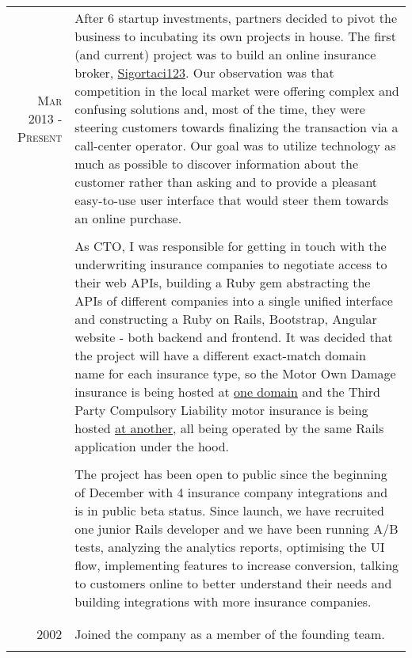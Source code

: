 \documentclass[a4paper,10pt]{article}
\newcommand{\exptitle}[2]{
  \multicolumn{2}{l}{\textsc{#1} \footnotesize{#2}} \\
  \specialrule{.01em}{0.5em}{1em}
}
\begin{document}
\begin{longtable}{r|p{11cm}}
  \textsc{Mar 2013 - Present}   & After 6 startup investments, partners decided to pivot the business to incubating its own projects in house. The first (and current) project was to build an online insurance broker, \href{https://sigortaci123.com}{Sigortaci123}. Our observation was that competition in the local market were offering complex and confusing solutions and, most of the time, they were steering customers towards finalizing the transaction via a call-center operator. Our goal was to utilize technology as much as possible to discover information about the customer rather than asking and to provide a pleasant easy-to-use user interface that would steer them towards an online purchase. \\
                                & \\
                                & As CTO, I was responsible for getting in touch with the underwriting insurance companies to negotiate access to their web APIs, building a Ruby gem abstracting the APIs of different companies into a single unified interface and constructing a Ruby on Rails, Bootstrap, Angular website - both backend and frontend. It was decided that the project will have a different exact-match domain name for each insurance type, so the Motor Own Damage insurance is being hosted at \href{http://kasko123.com}{one domain} and the Third Party Compulsory Liability motor insurance is being hosted \href{http://trafik123.com}{at another}, all being operated by the same Rails application under the hood. \\
                                & \\
                                & The project has been open to public since the beginning of December with 4 insurance company integrations and is in public beta status. Since launch, we have recruited one junior Rails developer and we have been running A/B tests, analyzing the analytics reports, optimising the UI flow, implementing features to increase conversion, talking to customers online to better understand their needs and building integrations with more insurance companies. \\
  \multicolumn{2}{c}{} \\

  \newpage

  \exptitle{PhonoClick}{Jan 2002 – Aug 2011}

  \textsc{2002}                 & Joined the company as a member of the founding team. \\
  \multicolumn{2}{c}{} \\


\end{longtable}
\end{document}
